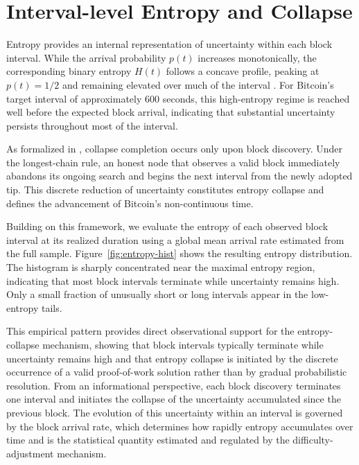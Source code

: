 \documentclass[conference]{IEEEtran}
\begin{document}
\section{Interval-level Entropy and Collapse}
\label{sec:entropy}


Entropy provides an internal representation of uncertainty within each block
interval. While the arrival probability $p(t)$ increases monotonically, the
corresponding binary entropy $H(t)$ follows a concave profile, peaking at
$p(t)=1/2$ and remaining elevated over much of the interval
\cite{coverthomas}. For Bitcoin’s target interval of approximately 600 seconds,
this high-entropy regime is reached well before the expected block arrival,
indicating that substantial uncertainty persists throughout most of the
interval.

As formalized in
\cite{chen2025noncontinuous}, collapse completion occurs only upon block discovery. Under the
longest-chain rule, an honest node that observes a valid block immediately
abandons its ongoing search and begins the next interval from the newly adopted
tip. This discrete reduction of uncertainty constitutes entropy collapse and
defines the advancement of Bitcoin’s non-continuous time.




Building on this framework, we evaluate the entropy of each observed block
interval at its realized duration using a global mean arrival rate estimated
from the full sample. Figure~\ref{fig:entropy-hist} shows the resulting entropy
distribution. The histogram is sharply concentrated near the maximal entropy
region, indicating that most block intervals terminate while uncertainty
remains high. Only a small fraction of unusually short or long intervals appear
in the low-entropy tails.

This empirical pattern provides direct observational support for the
entropy-collapse mechanism, showing that block intervals typically terminate
while uncertainty remains high and that entropy collapse is initiated by the
discrete occurrence of a valid proof-of-work solution rather than by gradual
probabilistic resolution. From an informational perspective, each block
discovery terminates one interval and initiates the collapse of the uncertainty
accumulated since the previous block. The evolution of this uncertainty within
an interval is governed by the block arrival rate, which determines how rapidly
entropy accumulates over time and is the statistical quantity estimated and
regulated by the difficulty-adjustment mechanism.
\end{document}

